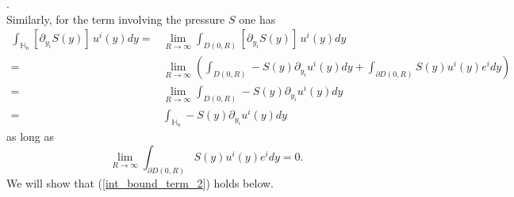 \documentclass[11pt, reqno]{amsart}
\theoremstyle{definition}
\theoremstyle{remark}
\numberwithin{equation}{section}
\begin{document}
\begin{appendices}
		.\\
		Similarly, for the term involving the pressure $S$ one has 
		\begin{align*}
			\int_{  \mathbb{H}_n  }  [ \partial_{y_i}S (y)]\,  u^i(y) dy= & 	\lim_{R\rightarrow\infty}  \int_{  D(0,R) }  [\partial_{y_i}S (y)]\,  u^i(y)   dy \\
			=&		\lim_{R\rightarrow\infty} \left( \int_{ D(0,R)  } -S(y)\partial_{y_i} u^i(y)dy   + 	\int_{\partial D(0,R)  }  S(y) u^i(y) e^i dy \right) \\
			=&		\lim_{R\rightarrow\infty}  \int_{  D(0,R)  } -S(y)\partial_{y_i} u^i(y)dy   \\
			=&		 \int_{ \mathbb{H}_n}    -S(y)\partial_{y_i} u^i(y) dy
		\end{align*}
		as long as
		\begin{equation}
			\lim_{R\rightarrow\infty} 	\int_{ \partial D(0,R)  }   S(y) u^i(y) e^i  dy
			=		 0 .\label{int_bound_term_2}
		\end{equation}
		We will show that (\ref{int_bound_term_2}) holds below.\\	
		

\end{appendices}
\end{document}
